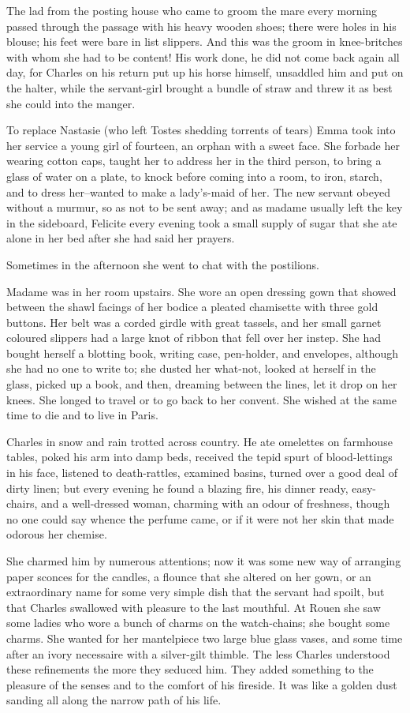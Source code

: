 \documentclass[11pt,twocolumn]{ltugboat}
\begin{document}
The lad from the posting house who came to groom the mare every morning
passed through the passage with his heavy wooden shoes; there were holes
in his blouse; his feet were bare in list slippers. And this was the
groom in knee-britches with whom she had to be content! His work done,
he did not come back again all day, for Charles on his return put up
his horse himself, unsaddled him and put on the halter, while the
servant-girl brought a bundle of straw and threw it as best she could
into the manger.

To replace Nastasie (who left Tostes shedding torrents of tears) Emma
took into her service a young girl of fourteen, an orphan with a sweet
face. She forbade her wearing cotton caps, taught her to address her in
the third person, to bring a glass of water on a plate, to knock before
coming into a room, to iron, starch, and to dress her--wanted to make a
lady's-maid of her. The new servant obeyed without a murmur, so as not
to be sent away; and as madame usually left the key in the sideboard,
Felicite every evening took a small supply of sugar that she ate alone
in her bed after she had said her prayers.

Sometimes in the afternoon she went to chat with the postilions.

Madame was in her room upstairs. She wore an open dressing gown that
showed between the shawl facings of her bodice a pleated chamisette with
three gold buttons. Her belt was a corded girdle with great tassels, and
her small garnet coloured slippers had a large knot of ribbon that fell
over her instep. She had bought herself a blotting book, writing case,
pen-holder, and envelopes, although she had no one to write to; she
dusted her what-not, looked at herself in the glass, picked up a book,
and then, dreaming between the lines, let it drop on her knees. She
longed to travel or to go back to her convent. She wished at the same
time to die and to live in Paris.

Charles in snow and rain trotted across country. He ate omelettes on
farmhouse tables, poked his arm into damp beds, received the tepid
spurt of blood-lettings in his face, listened to death-rattles, examined
basins, turned over a good deal of dirty linen; but every evening he
found a blazing fire, his dinner ready, easy-chairs, and a well-dressed
woman, charming with an odour of freshness, though no one could say
whence the perfume came, or if it were not her skin that made odorous
her chemise.

She charmed him by numerous attentions; now it was some new way of
arranging paper sconces for the candles, a flounce that she altered on
her gown, or an extraordinary name for some very simple dish that the
servant had spoilt, but that Charles swallowed with pleasure to the last
mouthful. At Rouen she saw some ladies who wore a bunch of charms on the
watch-chains; she bought some charms. She wanted for her mantelpiece two
large blue glass vases, and some time after an ivory necessaire with a
silver-gilt thimble. The less Charles understood these refinements
the more they seduced him. They added something to the pleasure of the
senses and to the comfort of his fireside. It was like a golden dust
sanding all along the narrow path of his life.
\end{document}
